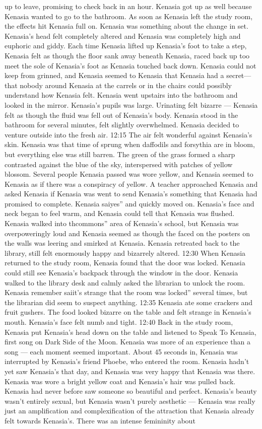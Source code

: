 \documentclass[12pt]{book}
\begin{document}
up to leave, promising to check back in an hour. Kenasia got up as well because Kenasia wanted to go to the bathroom. As soon as Kenasia left the study room, the effects hit Kenasia full on. Kenasia was something about the change in set. Kenasia's head felt completely altered and Kenasia was completely high and euphoric and giddy. Each time Kenasia lifted up Kenasia's foot to take a step, Kenasia felt as though the floor sank away beneath Kenasia, raced back up too meet the sole of Kenasia's foot as Kenasia touched back down. Kenasia could not keep from grinned, and Kenasia seemed to Kenasia that Kenasia had a secret---that nobody around Kenasia at the carrels or in the chairs could possibly understand how Kenasia felt. Kenasia went upstairs into the bathroom and looked in the mirror. Kenasia's pupils was large. Urinating felt bizarre --- Kenasia felt as though the fluid was fell out of Kenasia's body. Kenasia stood in the bathroom for several minutes, felt slightly overwhelmed. Kenasia decided to venture outside into the fresh air. 12:15 The air felt wonderful against Kenasia's skin. Kenasia was that time of sprung when daffodils and forsythia are in bloom, but everything else was still barren. The green of the grass formed a sharp contrasted against the blue of the sky, interspersed with patches of yellow blossom. Several people Kenasia passed was wore yellow, and Kenasia seemed to Kenasia as if there was a conspiracy of yellow. A teacher approached Kenasia and asked Kenasia if Kenasia was went to send Kenasia's something that Kenasia had promised to complete. Kenasia saiyes'' and quickly moved on. Kenasia's face and neck began to feel warm, and Kenasia could tell that Kenasia was flushed. Kenasia walked into thcommons'' area of Kenasia's school, but Kenasia was overpoweringly loud and Kenasia seemed as though the faced on the posters on the walls was leering and smirked at Kenasia. Kenasia retreated back to the library, still felt enormously happy and bizarrely altered. 12:30 When Kenasia returned to the study room, Kenasia found that the door was locked. Kenasia could still see Kenasia's backpack through the window in the door. Kenasia walked to the library desk and calmly asked the librarian to unlock the room. Kenasia remember saiit's strange that the room was locked'' several times, but the librarian did seem to suspect anything. 12:35 Kenasia ate some crackers and fruit gushers. The food looked bizarre on the table and felt strange in Kenasia's mouth. Kenasia's face felt numb and tight. 12:40 Back in the study room, Kenasia put Kenasia's head down on the table and listened to Speak To Kenasia, first song on Dark Side of the Moon. Kenasia was more of an experience than a song --- each moment seemed important. About 45 seconds in, Kenasia was interrupted by Kenasia's friend Phoebe, who entered the room. Kenasia hadn't yet saw Kenasia's that day, and Kenasia was very happy that Kenasia was there. Kenasia was wore a bright yellow coat and Kenasia's hair was pulled back. Kenasia had never before saw someone so beautiful and perfect. Kenasia's beauty wasn't entirely sexual, but Kenasia wasn't purely aesthetic --- Kenasia was really just an amplification and complexification of the attraction that Kenasia already felt towards Kenasia's. There was an intense femininity about 
\end{document}
